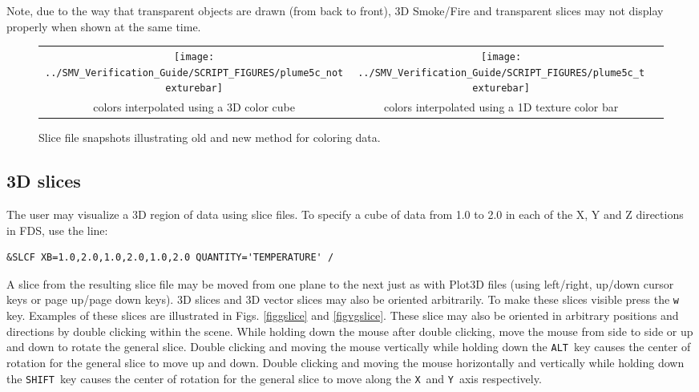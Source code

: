 \documentclass[11pt,twoside]{book}
\begin{document}
Note, due to the way that transparent objects are drawn (from back to front),
3D Smoke/Fire and transparent slices may not display
properly when shown at the same time.

\begin{figure}[\figoptions]
\begin{center}
\begin{tabular}{ccc}
\texttt{[image: ../SMV\_Verification\_Guide/SCRIPT\_FIGURES/plume5c\_notexturebar]}&
\texttt{[image: ../SMV\_Verification\_Guide/SCRIPT\_FIGURES/plume5c\_texturebar]}\\
colors interpolated using a 3D color cube&colors interpolated using a 1D texture color bar\\
\end{tabular}
\caption [Slice file snapshots illustrating old and new method for
coloring data.] {Slice file snapshots illustrating old and new
method for coloring data.}
\label{fignewslice}%
\end{center}
\end{figure}

\subsection{3D slices}
The user may visualize a 3D region of data using slice files.
To specify a cube of data from 1.0 to 2.0 in each
of the X, Y and Z directions in FDS, use the line:
\begin{lstlisting}
&SLCF XB=1.0,2.0,1.0,2.0,1.0,2.0 QUANTITY='TEMPERATURE' /
\end{lstlisting}

A slice from the resulting slice file
may be moved from one plane to the next just as with Plot3D
files (using left/right, up/down cursor keys or page up/page down
keys).  3D slices and 3D vector slices may also be oriented arbitrarily.
To make these slices visible press the {\tt w} key.  Examples of
these slices are illustrated in Figs. \ref{figgslice} and \ref{figvgslice}.
These slice may also be oriented in arbitrary positions and directions by
double clicking within the scene.  While holding down the mouse after double clicking,
move the mouse from
side to side or up and down to rotate the general slice.  Double clicking and moving
the mouse vertically while holding down the {\tt ALT}\
key causes the center of rotation for the general slice to move up and down.
Double clicking and moving the mouse horizontally and vertically while holding down
the {\tt SHIFT}\ key causes the center of rotation for the general slice to move along
the {\tt X}\ and {\tt Y}\ axis respectively.
\end{document}
